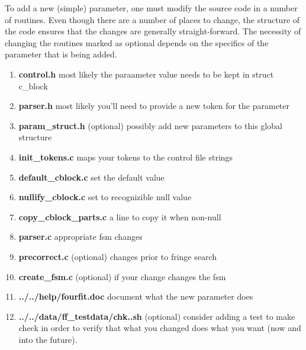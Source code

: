 To add a new (simple) parameter, one must modify the source
code in a number of routines. Even though there are a number
of places to change, the structure of the code ensures that
the changes are generally straight-forward.
The necessity of changing the routines marked as optional 
depends on the specifics of the parameter that is being added.
\begin{enumerate}
\item\textbf{control.h}
    most likely the paraameter value needs to be kept in struct c\_block

\item\textbf{parser.h}
    most likely you'll need to provide a new token for the parameter

\item\textbf{param\_struct.h} (optional)
    possibly add new parameters to this global structure

\item\textbf{init\_tokens.c}
    maps your tokens to the control file strings

\item\textbf{default\_cblock.c}
    set the default value

\item\textbf{nullify\_cblock.c}
    set to recognizible null value

\item\textbf{copy\_cblock\_parts.c}
    a line to copy it when non-null

\item\textbf{parser.c}
    appropriate fsm changes

\item\textbf{precorrect.c} (optional)
    changes prior to fringe search

\item\textbf{create\_fsm.c} (optional)
    if your change changes the fsm

\item\textbf{../../help/fourfit.doc}
    document what the new parameter does

\item\textbf{../../data/ff\_testdata/chk..sh} (optional)
    consider adding a test to make check in
    order to verify that what you changed
    does what you want (now and into the future).

\end{enumerate}
